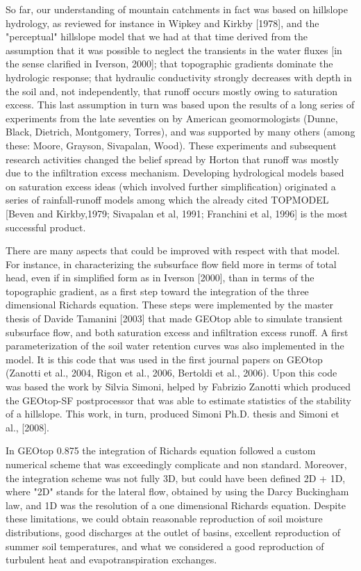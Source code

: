 So far, our understanding of mountain catchments in fact was based on hillslope hydrology, as reviewed for instance in Wipkey and Kirkby [1978], and  the "perceptual" hillslope model that we had at that time derived from the assumption that it was possible to neglect the transients in the water fluxes [in the sense clarified in Iverson, 2000]; that topographic gradients dominate the hydrologic response; that hydraulic conductivity strongly decreases with depth in the soil and, not independently, that runoff occurs mostly owing to saturation excess. 
This last assumption in turn was  based upon the results of a long series of experiments from the late seventies on by American geomormologists (Dunne, Black, Dietrich, Montgomery, Torres), and was supported by many others (among these: Moore, Grayson, Sivapalan, Wood). 
These experiments and subsequent research activities changed the belief spread by Horton that runoff was mostly due to the infiltration excess mechanism. Developing hydrological models based on saturation excess ideas (which involved further simplification) originated a series of rainfall-runoff models among which the already cited TOPMODEL [Beven and Kirkby,1979; Sivapalan et al, 1991; Franchini et al, 1996] is the most successful product. 
 
There are many aspects that could be improved with respect with that model. For instance,  in characterizing  the subsurface flow field more in terms of total head, even if in simplified form as in Iverson [2000], than in terms of the topographic gradient, as a first step toward the integration of the three dimensional Richards equation. These  steps were implemented by the master thesis of Davide Tamanini [2003] that made GEOtop able to simulate transient subsurface flow, and both saturation excess and infiltration excess runoff.  A first parameterization of the soil water retention curves was also implemented in the model. It is this code that was used in the first journal papers on GEOtop (Zanotti et al., 2004, Rigon et al., 2006, Bertoldi et al., 2006). Upon this code was based the work by Silvia Simoni, helped by Fabrizio Zanotti which produced the GEOtop-SF postprocessor that was able to estimate statistics of the stability of a hillslope. This work, in turn, produced Simoni Ph.D. thesis  and Simoni et al., [2008]. 

In GEOtop 0.875 the integration of Richards equation followed a custom numerical scheme that was exceedingly complicate and non standard. Moreover, the integration scheme was not fully 3D, but could have been defined 2D + 1D, where "2D" stands for the lateral flow, obtained by using the Darcy Buckingham law, and 1D was the resolution of a one dimensional Richards equation. Despite these limitations, we could obtain reasonable reproduction of soil moisture distributions,  good discharges at the outlet of basins, excellent reproduction of summer soil temperatures, and what we considered a good reproduction of turbulent heat and evapotranspiration exchanges. 


